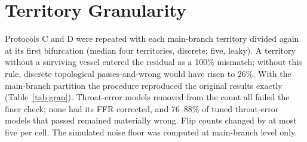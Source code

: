 \documentclass[journal,twoside,web,onecolumn]{ieeecolor}
\begin{document}
\section{Territory Granularity}\label{sec:granularity}
Protocols C and D were repeated with each main-branch territory divided again at its first bifurcation (median four territories, discrete; five, leaky). A territory without a surviving vessel entered the residual as a 100\% mismatch; without this rule, discrete topological passes-and-wrong would have risen to 26\%. With the main-branch partition the
procedure reproduced the original results exactly (Table~\ref{tab:gran}). Throat-error models removed from the count
all failed the finer check; none had its FFR corrected, and 76--88\% of tuned throat-error models that passed remained
materially wrong. Flip counts changed by at most five per cell. The simulated noise floor was computed at
main-branch level only.
\end{document}
